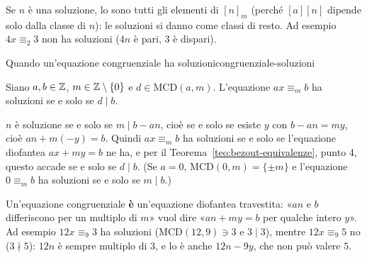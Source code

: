 Se $n$ è una soluzione, lo sono tutti gli elementi di $[n]_m$ (perché $[a][n]$ dipende solo dalla classe di $n$): le soluzioni si danno
come classi di resto. Ad esempio $4x \equiv_2 3$ non ha soluzioni ($4n$ è pari, $3$ è dispari).

\begin{concetto}
\begin{Teorema}{Quando un'equazione congruenziale ha soluzioni}{congruenziale-soluzioni}
    \begin{prerequisiti}
    \end{prerequisiti}
    Siano $a, b \in \mathbb{Z}$, $m \in \mathbb{Z} \setminus \{0\}$ e $d \in \mathrm{MCD}(a, m)$. L'equazione $ax \equiv_m b$ ha soluzioni se e solo se $d \mid b$.
\end{Teorema}
\begin{dimostrazione}
    $n$ è soluzione se e solo se $m \mid b - an$, cioè se e solo se esiste $y$ con $b - an = my$, cioè $an + m(-y) = b$. Quindi
    $ax \equiv_m b$ ha soluzioni se e solo se l'equazione diofantea $ax + my = b$ ne ha, e per il Teorema~\ref{teo:bezout-equivalenze}, punto 4,
    questo accade se e solo se $d \mid b$. (Se $a = 0$, $\mathrm{MCD}(0, m) = \{\pm m\}$ e l'equazione $0 \equiv_m b$ ha soluzioni se e solo se $m \mid b$.)
\end{dimostrazione}
\end{concetto}

\begin{spiegazione}
    Un'equazione congruenziale \textbf{è} un'equazione diofantea travestita: «$an$ e $b$ differiscono per un multiplo di $m$» vuol dire
    «$an + my = b$ per qualche intero $y$». Ad esempio $12x \equiv_9 3$ ha soluzioni ($\mathrm{MCD}(12, 9) \ni 3$ e $3 \mid 3$), mentre $12x \equiv_9 5$ no
    ($3 \nmid 5$): $12n$ è sempre multiplo di $3$, e lo è anche $12n - 9y$, che non può valere $5$.
\end{spiegazione}

